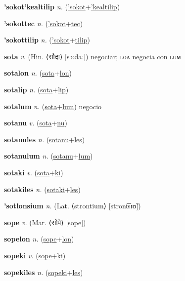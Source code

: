 \textbf{\hypertarget{'sokot'kealtilip}{'sokot'kealtilip}} \textit{n.} (\hyperlink{'sokot}{'sokot}+\allowbreak \hyperlink{'kealtilip}{'kealtilip})


\textbf{\hypertarget{'sokottec}{'sokottec}} \textit{n.} (\hyperlink{'sokot}{'sokot}+\allowbreak \hyperlink{tec}{tec})


\textbf{\hypertarget{'sokottilip}{'sokottilip}} \textit{n.} (\hyperlink{'sokot}{'sokot}+\allowbreak \hyperlink{tilip}{tilip})


\textbf{\hypertarget{sota}{sota}} \textit{v.} (Hin. ⟨{\devanagari{}सौदा}⟩ [sɔːdaː])
negociar; \hyperlink{sotalon}{ʟᴏᴧ} negocia con \hyperlink{sotalum}{ʟᴜᴍ}

\textbf{\hypertarget{sotalon}{sotalon}} \textit{n.} (\hyperlink{sota}{sota}+\allowbreak \hyperlink{lon}{lon})


\textbf{\hypertarget{sotalip}{sotalip}} \textit{n.} (\hyperlink{sota}{sota}+\allowbreak \hyperlink{lip}{lip})


\textbf{\hypertarget{sotalum}{sotalum}} \textit{n.} (\hyperlink{sota}{sota}+\allowbreak \hyperlink{lum}{lum})
negocio

\textbf{\hypertarget{sotanu}{sotanu}} \textit{v.} (\hyperlink{sota}{sota}+\allowbreak \hyperlink{nu}{nu})


\textbf{\hypertarget{sotanules}{sotanules}} \textit{n.} (\hyperlink{sotanu}{sotanu}+\allowbreak \hyperlink{les}{les})


\textbf{\hypertarget{sotanulum}{sotanulum}} \textit{n.} (\hyperlink{sotanu}{sotanu}+\allowbreak \hyperlink{lum}{lum})


\textbf{\hypertarget{sotaki}{sotaki}} \textit{v.} (\hyperlink{sota}{sota}+\allowbreak \hyperlink{ki}{ki})


\textbf{\hypertarget{sotakiles}{sotakiles}} \textit{n.} (\hyperlink{sotaki}{sotaki}+\allowbreak \hyperlink{les}{les})


\textbf{\hypertarget{'sotlonsium}{'sotlonsium}} \textit{n.} (Lat. ⟨strontium⟩ [stront͡sɪʊ̃])


\textbf{\hypertarget{sope}{sope}} \textit{v.} (Mar. ⟨{\devanagari{}सोपे}⟩ [sope])


\textbf{\hypertarget{sopelon}{sopelon}} \textit{n.} (\hyperlink{sope}{sope}+\allowbreak \hyperlink{lon}{lon})


\textbf{\hypertarget{sopeki}{sopeki}} \textit{v.} (\hyperlink{sope}{sope}+\allowbreak \hyperlink{ki}{ki})


\textbf{\hypertarget{sopekiles}{sopekiles}} \textit{n.} (\hyperlink{sopeki}{sopeki}+\allowbreak \hyperlink{les}{les})


